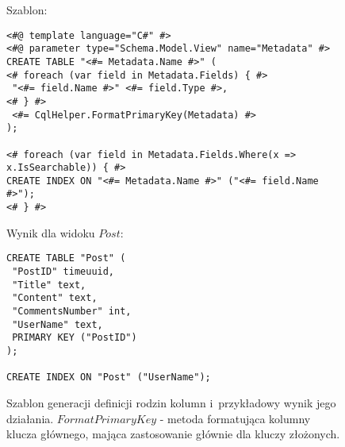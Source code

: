 \begin{figure}[!ht]
Szablon:

\begin{verbatim}
<#@ template language="C#" #>
<#@ parameter type="Schema.Model.View" name="Metadata" #>
CREATE TABLE "<#= Metadata.Name #>" (
<# foreach (var field in Metadata.Fields) { #>
 "<#= field.Name #>" <#= field.Type #>,
<# } #>
 <#= CqlHelper.FormatPrimaryKey(Metadata) #>
);

<# foreach (var field in Metadata.Fields.Where(x => x.IsSearchable)) { #>
CREATE INDEX ON "<#= Metadata.Name #>" ("<#= field.Name #>");
<# } #>
\end{verbatim}

Wynik dla widoku $Post$:

\begin{verbatim}
CREATE TABLE "Post" (
 "PostID" timeuuid,
 "Title" text,
 "Content" text,
 "CommentsNumber" int,
 "UserName" text,
 PRIMARY KEY ("PostID")
);

CREATE INDEX ON "Post" ("UserName");
\end{verbatim}

\caption{
 Szablon generacji definicji rodzin kolumn i~przykładowy wynik jego działania.
 $FormatPrimaryKey$ - metoda formatująca kolumny klucza głównego, mająca zastosowanie głównie dla kluczy złożonych.
}
\label{fig:single:template_table}
\end{figure}
